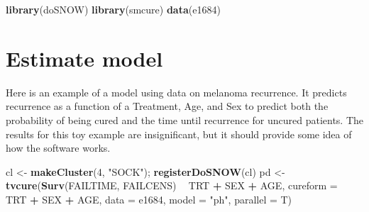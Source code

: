 \documentclass[]{article}
\newenvironment{Shaded}{\begin{snugshade}}{\end{snugshade}}
\newcommand{\DataTypeTok}[1]{\textcolor[rgb]{0.13,0.29,0.53}{#1}}
\newcommand{\DecValTok}[1]{\textcolor[rgb]{0.00,0.00,0.81}{#1}}
\newcommand{\KeywordTok}[1]{\textcolor[rgb]{0.13,0.29,0.53}{\textbf{#1}}}
\newcommand{\NormalTok}[1]{#1}
\newcommand{\OperatorTok}[1]{\textcolor[rgb]{0.81,0.36,0.00}{\textbf{#1}}}
\newcommand{\StringTok}[1]{\textcolor[rgb]{0.31,0.60,0.02}{#1}}
\begin{document}
\begin{Shaded}
\begin{Highlighting}[]
\KeywordTok{library}\NormalTok{(doSNOW)}
\KeywordTok{library}\NormalTok{(smcure)}
\KeywordTok{data}\NormalTok{(e1684)}
\end{Highlighting}
\end{Shaded}

\hypertarget{estimate-model}{%
\section{Estimate model}\label{estimate-model}}

Here is an example of a model using data on melanoma recurrence. It
predicts recurrence as a function of a Treatment, Age, and Sex to
predict both the probability of being cured and the time until
recurrence for uncured patients. The results for this toy example are
insignificant, but it should provide some idea of how the software
works.

\begin{Shaded}
\begin{Highlighting}[]
\NormalTok{cl <-}\StringTok{ }\KeywordTok{makeCluster}\NormalTok{(}\DecValTok{4}\NormalTok{, }\StringTok{"SOCK"}\NormalTok{); }\KeywordTok{registerDoSNOW}\NormalTok{(cl)}
\NormalTok{pd <-}\StringTok{ }\KeywordTok{tvcure}\NormalTok{(}\KeywordTok{Surv}\NormalTok{(FAILTIME, FAILCENS) }\OperatorTok{~}\StringTok{ }\NormalTok{TRT }\OperatorTok{+}\StringTok{ }\NormalTok{SEX }\OperatorTok{+}\StringTok{ }\NormalTok{AGE, }\DataTypeTok{cureform =} \OperatorTok{~}\StringTok{ }\NormalTok{TRT }\OperatorTok{+}\StringTok{ }\NormalTok{SEX }\OperatorTok{+}\StringTok{ }\NormalTok{AGE, }\DataTypeTok{data =}\NormalTok{ e1684, }\DataTypeTok{model =} \StringTok{"ph"}\NormalTok{, }\DataTypeTok{parallel =}\NormalTok{ T)}
\end{Highlighting}
\end{Shaded}
\end{document}
